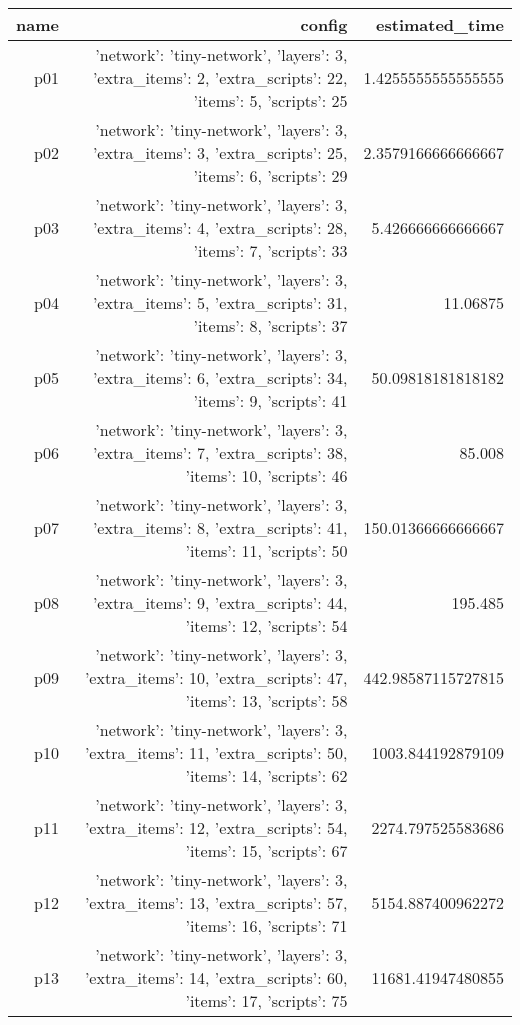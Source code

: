 \documentclass{article}
\begin{document}
                            \begin{center}
                            \scriptsize
                            \begin{tabular}{r|r|r}
                            name & config & estimated\_time\\\midrule
                              p01&{'network': 'tiny-network', 'layers': 3, 'extra\_items': 2, 'extra\_scripts': 22, 'items': 5, 'scripts': 25}&1.4255555555555555\\
  p02&{'network': 'tiny-network', 'layers': 3, 'extra\_items': 3, 'extra\_scripts': 25, 'items': 6, 'scripts': 29}&2.3579166666666667\\
  p03&{'network': 'tiny-network', 'layers': 3, 'extra\_items': 4, 'extra\_scripts': 28, 'items': 7, 'scripts': 33}&5.426666666666667\\
  p04&{'network': 'tiny-network', 'layers': 3, 'extra\_items': 5, 'extra\_scripts': 31, 'items': 8, 'scripts': 37}&11.06875\\
  p05&{'network': 'tiny-network', 'layers': 3, 'extra\_items': 6, 'extra\_scripts': 34, 'items': 9, 'scripts': 41}&50.09818181818182\\
  p06&{'network': 'tiny-network', 'layers': 3, 'extra\_items': 7, 'extra\_scripts': 38, 'items': 10, 'scripts': 46}&85.008\\
  p07&{'network': 'tiny-network', 'layers': 3, 'extra\_items': 8, 'extra\_scripts': 41, 'items': 11, 'scripts': 50}&150.01366666666667\\
  p08&{'network': 'tiny-network', 'layers': 3, 'extra\_items': 9, 'extra\_scripts': 44, 'items': 12, 'scripts': 54}&195.485\\
  p09&{'network': 'tiny-network', 'layers': 3, 'extra\_items': 10, 'extra\_scripts': 47, 'items': 13, 'scripts': 58}&442.98587115727815\\
  p10&{'network': 'tiny-network', 'layers': 3, 'extra\_items': 11, 'extra\_scripts': 50, 'items': 14, 'scripts': 62}&1003.844192879109\\
  p11&{'network': 'tiny-network', 'layers': 3, 'extra\_items': 12, 'extra\_scripts': 54, 'items': 15, 'scripts': 67}&2274.797525583686\\
  p12&{'network': 'tiny-network', 'layers': 3, 'extra\_items': 13, 'extra\_scripts': 57, 'items': 16, 'scripts': 71}&5154.887400962272\\
  p13&{'network': 'tiny-network', 'layers': 3, 'extra\_items': 14, 'extra\_scripts': 60, 'items': 17, 'scripts': 75}&11681.41947480855\\

\end{tabular}
\end{center}
\end{document}
